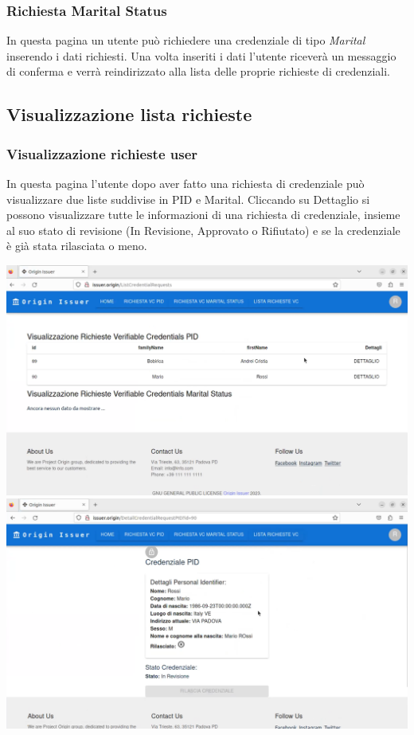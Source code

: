 \subsubsection{Richiesta Marital Status}
In questa pagina un utente può richiedere una credenziale di tipo \textit{Marital} inserendo i dati richiesti. Una volta inseriti i dati l'utente riceverà un messaggio di conferma e verrà reindirizzato alla lista delle proprie richieste di credenziali.

\subsection{Visualizzazione lista richieste}
\subsubsection{Visualizzazione richieste user} 
In questa pagina l'utente dopo aver fatto una richiesta di credenziale può visualizzare due liste suddivise in PID e Marital. Cliccando su Dettaglio si possono visualizzare tutte le informazioni di una richiesta di credenziale, insieme al suo stato di revisione (In Revisione, Approvato o Rifiutato) e se la credenziale è già stata rilasciata o meno.
\begin{center}
    \includegraphics[scale = 0.2]{./res/img/issuer/new/listauser1.png}
    \includegraphics[scale = 0.2]{./res/img/issuer/new/listauser2.png}

\end{center}

